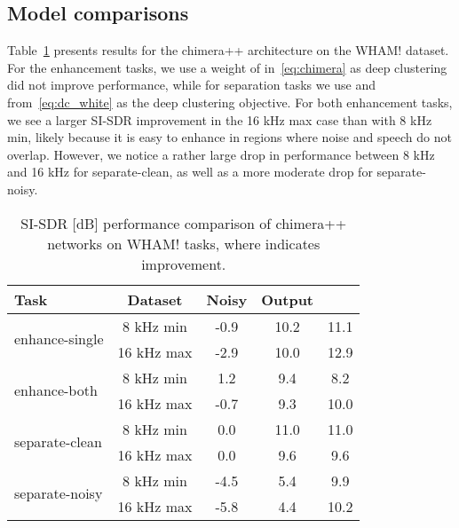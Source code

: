 \documentclass[a4paper]{article}
\begin{document}
\subsection{Model comparisons}
Table~\ref{table:compare} presents results for the chimera++ architecture on the WHAM! dataset.  For the enhancement tasks, we use a weight of  in~\eqref{eq:chimera} as deep clustering did not improve performance, while for separation tasks we use  and  from~\eqref{eq:dc_white} as the deep clustering objective.  For both enhancement tasks, we see a larger SI-SDR improvement in the 16 kHz max case than with 8 kHz min, likely because it is easy to enhance in regions where noise and speech do not overlap.  However, we notice a rather large drop in performance between 8 kHz and 16 kHz for separate-clean, as well as a more moderate drop for separate-noisy. 

 \begin{table}[tbp]
    \footnotesize
    \caption{SI-SDR [dB] performance comparison of chimera++ networks on WHAM! tasks, where  indicates  improvement.}\vspace{-0.6cm}
    \begin{center}
      \label{table:compare}
      \begin{tabular}{lcccc}\hline
        Task & Dataset & Noisy & Output &  \\ \hline \hline
        \multirow{2}{*}{enhance-single} & \phantom{1}8 kHz min & -0.9 & 10.2 & 11.1  \\
         & 16 kHz max & -2.9 & 10.0 & 12.9  \\ \hline
        \multirow{2}{*}{enhance-both} & \phantom{1}8 kHz min & \phantom{-}1.2 & \phantom{1}9.4 & \phantom{1}8.2  \\ 
         & 16 kHz max & -0.7 & \phantom{1}9.3 & 10.0  \\ \hline
        \multirow{2}{*}{separate-clean} & \phantom{1}8 kHz min & \phantom{-}0.0 & 11.0 & 11.0  \\ 
         & 16 kHz max & \phantom{-}0.0 & \phantom{1}9.6 & \phantom{1}9.6  \\ \hline
        \multirow{2}{*}{separate-noisy} & \phantom{1}8 kHz min & -4.5 & \phantom{1}5.4 & \phantom{1}9.9  \\ 
        & 16 kHz max & -5.8 & \phantom{1}4.4 & 10.2  \\ \hline
      \end{tabular}\vspace{-.5cm}
    \end{center}
  \end{table}
  
\end{document}
